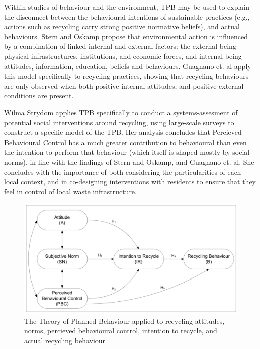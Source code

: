 \documentclass[nofonts,nols,justified,nobib]{tufte-book}
\begin{document}

Within studies of behaviour and the environment, TPB may be used to explain the disconnect between the behavioural intentions of sustainable practices (e.g., actions such as recycling carry strong positive normative beliefs), and actual behaviours. Stern and Oskamp propose that environmental action is influenced by a combination of linked internal and external factors: the external being physical infrastructures, institutions, and economic forces, and internal being attitudes, information, education, beliefs and behaviours\cite{stern_managing_1987}. Guagnano et. al apply this model specifically to recycling practices, showing that recycling behaviours are only observed when both positive internal attitudes, and positive external conditions are present\cite{guagnano_influences_1995}.

Wilma Strydom applies TPB specifically to conduct a systems-assesment of potential social interventions around recycling, using large-scale surveys to construct a specific model of the TPB. Her analysis concludes that Percieved Behavioural Control has a much greater contribution to behavioural than even the intention to perform that behaviour (which itself is shaped mostly by social norms), in line with the findings of Stern and Oskamp, and Guagnano et. al. She concludes with the importance of both considering the particularities of each local context, and in co-designing interventions with residents to ensure that they feel in control of local waste infrastructure. \cite{strydom_applying_2018}

\begin{figure}
\includegraphics[width=\textwidth]{img/1/tpb-recycling.png}
\caption{The Theory of Planned Behaviour applied to recycling attitudes, norms, percieved behavioural control, intention to recycle, and actual recycling behaviour \cite{strydom_applying_2018}}
\end{figure}
\end{document}
